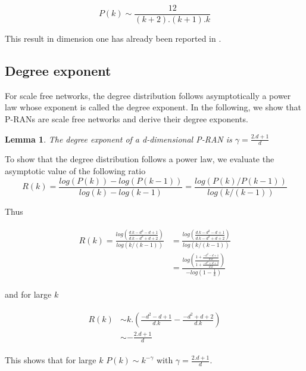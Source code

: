 \documentclass[11pt]{iopart}
\newtheorem{lemma}[theorem]{Lemma}
\newenvironment{proof}[1][Proof]{\begin{trivlist}
    \item[\hskip \labelsep {\bfseries #1}]}{\end{trivlist}}
\newcommand{\qed}{\nobreak \ifvmode \relax \else
          \ifdim\lastskip<1.5em \hskip-\lastskip
          \hskip1.5em plus0em minus0.5em \fi \nobreak
          \vrule height0.75em width0.5em depth0.25em\fi}
\begin{document}
\begin{equation}
\label{Eq.dd18}
   P(k) \sim \frac{12}{(k+2).(k+1).k}
\end{equation}

This result in dimension one has already been reported in \cite{Dorogovtsev:cond-mat0011115}.



\subsection{Degree exponent}
For scale free networks, the degree distribution follows asymptotically a power law whose exponent is called the degree exponent. In the following, we show that P-RANs are scale free networks and derive their degree exponents.

\begin{lemma}
The degree exponent of a d-dimensional P-RAN is $\gamma=\frac{2.d+1}{d}$
\end{lemma}

\begin{proof}
To show that the degree distribution follows a power law, we evaluate the asymptotic value of the following ratio
\begin{equation}
\label{de1}
   R(k)=\frac{log(P(k))-log(P(k-1))}{log(k)-log(k-1)}=\frac{log(P(k)/P(k-1))}{log(k/(k-1))}
\end{equation}

Thus

\begin{eqnarray}
\label{de2}
   \begin{array}{ll}
   R(k) =  \frac{log(\frac{d.k-d^2-d+1}{d.k-d^2+d+2})}{log(k/(k-1))} &= \frac{log(\frac{d.k-d^2-d+1}{d.k-d^2+d+2})}{log(k/(k-1))}\\
            &= \frac{log(\frac{1+\frac{-d^2-d+1}{d.k}}{1+\frac{-d^2+d+2}{d.k}})}{-log(1-\frac{1}{k})}
   \end{array}
\end{eqnarray}


and for large $k$

\begin{eqnarray}
\label{de3}
   \begin{array}{ll}
   R(k) & \sim k.\left(\frac{-d^2-d+1}{d.k} - \frac{-d^2+d+2}{d.k}\right) \\
        & \sim -\frac{2.d+1}{d}
   \end{array}
\end{eqnarray}

This shows that for large $k$ $P(k) \sim k^{-\gamma}$ with $\gamma=\frac{2.d+1}{d}$.
\qed
\end{proof}
\end{document}
